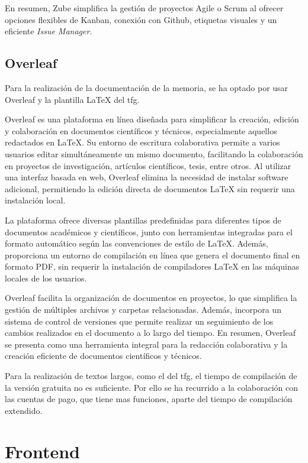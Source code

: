 En resumen, Zube simplifica la gestión de proyectos Agile o Scrum al ofrecer opciones flexibles de Kanban, conexión con Github, etiquetas visuales y un eficiente \textit{Issue Manager}.

\subsection{Overleaf}

Para la realización de la documentación de la memoria, se ha optado por usar Overleaf y la plantilla LaTeX del \acrshort{tfg}.

Overleaf es una plataforma en línea diseñada para simplificar la creación, edición y colaboración en documentos científicos y técnicos, especialmente aquellos redactados en LaTeX. Su entorno de escritura colaborativa permite a varios usuarios editar simultáneamente un mismo documento, facilitando la colaboración en proyectos de investigación, artículos científicos, tesis, entre otros. Al utilizar una interfaz basada en web, Overleaf elimina la necesidad de instalar software adicional, permitiendo la edición directa de documentos LaTeX sin requerir una instalación local.

La plataforma ofrece diversas plantillas predefinidas para diferentes tipos de documentos académicos y científicos, junto con herramientas integradas para el formato automático según las convenciones de estilo de LaTeX. Además, proporciona un entorno de compilación en línea que genera el documento final en formato PDF, sin requerir la instalación de compiladores LaTeX en las máquinas locales de los usuarios.

Overleaf facilita la organización de documentos en proyectos, lo que simplifica la gestión de múltiples archivos y carpetas relacionadas. Además, incorpora un sistema de control de versiones que permite realizar un seguimiento de los cambios realizados en el documento a lo largo del tiempo. En resumen, Overleaf se presenta como una herramienta integral para la redacción colaborativa y la creación eficiente de documentos científicos y técnicos.

Para la realización de textos largos, como el del \acrshort{tfg}, el tiempo de compilación de la versión gratuita no es suficiente. Por ello se ha recurrido a la colaboración con las cuentas de pago, que tiene mas funciones, aparte del tiempo de compilación extendido.

\section{Frontend}

